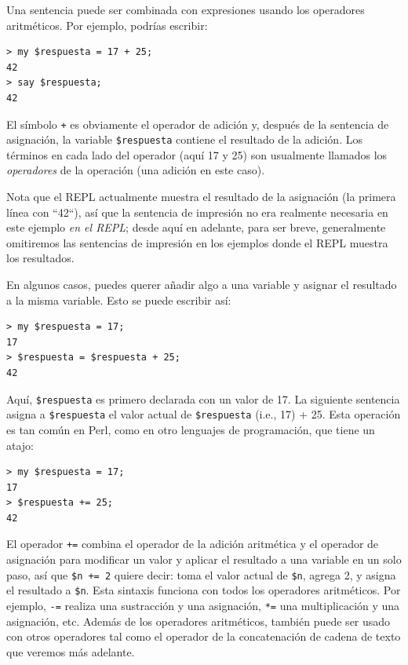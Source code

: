 Una sentencia puede ser combinada con expresiones usando los operadores
aritméticos. Por ejemplo, podrías escribir:

\begin{verbatim}
> my $respuesta = 17 + 25;
42
> say $respuesta;
42
\end{verbatim}
%

El símbolo \verb'+' es obviamente el operador de adición y,
después de la sentencia de asignación, la variable \verb'$respuesta'
contiene el resultado de la adición. Los términos en cada lado del operador
(aquí 17 y 25) son usualmente llamados los \emph{operadores}
de la operación (una adición en este caso).

Nota que el REPL actualmente muestra el resultado de la asignación
(la primera línea con ``42``), así que la sentencia de impresión 
no era realmente necesaria en este ejemplo \emph{en el REPL};
desde aquí en adelante, para ser breve, generalmente omitiremos las sentencias
de impresión en los ejemplos donde el REPL muestra los resultados.

En algunos casos, puedes querer añadir algo a una variable y 
asignar el resultado a la misma variable. Esto se puede escribir
así:

\begin{verbatim}
> my $respuesta = 17;
17
> $respuesta = $respuesta + 25;
42
\end{verbatim}
%

Aquí, \verb"$respuesta" es primero declarada con un valor de 17. La siguiente sentencia
asigna a  \verb"$respuesta" el valor actual de  \verb"$respuesta" (i.e., 17) + 25.
Esta operación es tan común en Perl, como en otro lenguajes de programación, que tiene
un atajo:

\begin{verbatim}
> my $respuesta = 17;
17
> $respuesta += 25;
42
\end{verbatim}
%

El operador \verb"+=" combina el operador de la adición aritmética 
y el operador de asignación para modificar un valor y aplicar 
el resultado a una variable en un solo paso, así que 
\verb"$n += 2" quiere decir: toma el valor actual de \verb|$n|, agrega
2, y asigna el resultado a \verb|$n|. Esta sintaxis funciona con todos
los operadores aritméticos. Por ejemplo, \verb|-=| realiza una
sustracción y una asignación, \verb|*=| una multiplicación y una asignación, etc.
Además de los operadores aritméticos, también puede ser usado con otros operadores 
tal como el operador de la concatenación de cadena de texto que veremos
más adelante.

